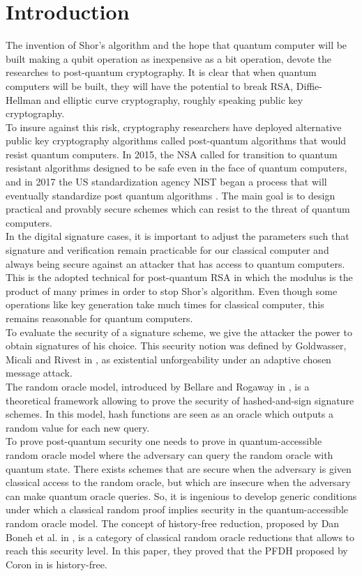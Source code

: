 \documentclass[a4paper,11pt]{article}
\begin{document}
\section{Introduction}
The invention of Shor's algorithm \cite{Shor} and the hope that quantum computer will be built making a qubit operation as inexpensive as a bit operation, devote the researches to post-quantum cryptography.
It is clear that when quantum computers will be built, they will have the potential to break RSA, Diffie-Hellman and elliptic curve cryptography, roughly speaking public key cryptography.\\
To insure against this risk, cryptography researchers have deployed alternative public key cryptography algorithms called post-quantum algorithms that would resist quantum computers. In 2015, the NSA called for transition to quantum resistant algorithms designed to be safe even in the face of quantum computers, and in 2017 the US standardization agency NIST began a process that will eventually standardize post quantum algorithms \cite{Nist}.
The main goal is to design  practical and provably secure schemes which can resist to the threat of  quantum computers.\\
In the digital signature cases, it is important to adjust the parameters such that signature and verification remain practicable for our classical computer and always being secure against an attacker that has access to quantum computers. This is the adopted technical for post-quantum RSA \cite{pqRSA} in which the modulus is the product of many primes in order to stop Shor's algorithm. Even though some operations like key generation take much times for classical computer, this remains reasonable for quantum computers.\\
To evaluate the security of a signature scheme, we give the attacker the power to obtain signatures of his choice. This security notion was defined by Goldwasser,  Micali and Rivest in \cite{Goldwasser}, as existential unforgeability under an adaptive chosen message attack.\\
The random oracle model, introduced by Bellare and Rogaway in \cite{Bellare1}, is a theoretical framework allowing to prove the security of hashed-and-sign signature schemes. In this model, hash functions are seen as an oracle which outputs a random value for each new query.\\
To prove post-quantum security one needs to prove in quantum-accessible random oracle model where the adversary can query the random oracle with quantum state. There exists schemes that are secure when the adversary is given classical access to the random oracle, but which are insecure when the adversary can make quantum oracle queries. So, it is ingenious to develop generic conditions under which a classical random proof implies security in the quantum-accessible random oracle model. The concept of history-free reduction, proposed by Dan Boneh et al. in \cite{pqROM}, is a category of classical random oracle reductions that allows to reach this security level. In this paper, they proved that the PFDH proposed by Coron in \cite{Coron-FDH} is history-free.
\end{document}
